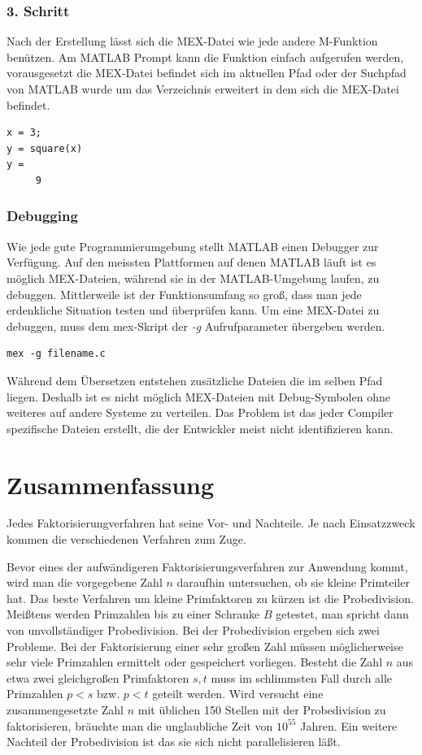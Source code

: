 \documentclass[10pt, bigheadings]{scrartcl}
\begin{document}
\subsubsection*{3. Schritt}
Nach der Erstellung lässt sich die MEX-Datei wie jede
andere M-Funktion benützen. Am MATLAB Prompt kann die
Funktion einfach aufgerufen werden, vorausgesetzt die
MEX-Datei befindet sich im aktuellen Pfad oder der Suchpfad
von MATLAB wurde um das Verzeichnis erweitert in dem sich
die MEX-Datei befindet.
\begin{verbatim}
x = 3;
y = square(x)
y =
     9
\end{verbatim}

\subsubsection*{Debugging}
Wie jede gute Programmierumgebung stellt MATLAB einen Debugger zur Verfügung.
Auf den meissten Plattformen auf denen MATLAB läuft ist es möglich MEX-Dateien,
während sie in der MATLAB-Umgebung laufen, zu debuggen. Mittlerweile ist der 
Funktionsumfang so groß, dass man jede erdenkliche Situation testen und 
überprüfen kann. Um eine MEX-Datei zu debuggen, muss dem mex-Skript der
\textit{-g} Aufrufparameter übergeben werden. 
\begin{verbatim}
mex -g filename.c
\end{verbatim}

Während dem Übersetzen entstehen zusätzliche Dateien die im selben Pfad 
liegen. Deshalb ist es nicht möglich MEX-Dateien mit Debug-Symbolen ohne
weiteres auf andere Systeme zu verteilen. Das Problem ist das jeder Compiler
spezifische Dateien erstellt, die der Entwickler meist nicht identifizieren
kann.

\section{Zusammenfassung}
Jedes Faktorisierungverfahren hat seine Vor- und Nachteile. Je nach Einsatzzweck
kommen die verschiedenen Verfahren zum Zuge. 

Bevor eines der aufwändigeren Faktorisierungsverfahren zur Anwendung kommt, wird
man die vorgegebene Zahl $n$ daraufhin untersuchen, ob sie kleine Primteiler hat.
Das beste Verfahren um  kleine Primfaktoren zu kürzen ist die Probedivision.
Meißtens werden Primzahlen bis zu einer Schranke $B$ getestet, man spricht dann
von unvollständiger Probedivision. Bei der Probedivision ergeben sich zwei
Probleme. Bei der Faktorisierung einer sehr großen Zahl müssen möglicherweise 
sehr viele Primzahlen ermittelt oder gespeichert vorliegen. Besteht die Zahl $n$
aus etwa zwei gleichgroßen Primfaktoren $s,t$ muss im schlimmsten Fall durch 
alle Primzahlen $p<s$ bzw. $p<t$ geteilt werden.
Wird versucht eine zusammengesetzte Zahl $n$ mit üblichen 150 Stellen mit der
Probedivision zu faktorisieren, bräuchte man die unglaubliche Zeit von $10^{55}$
Jahren. Ein weitere Nachteil der Probedivision ist das sie sich nicht 
parallelisieren läßt.
\end{document}
